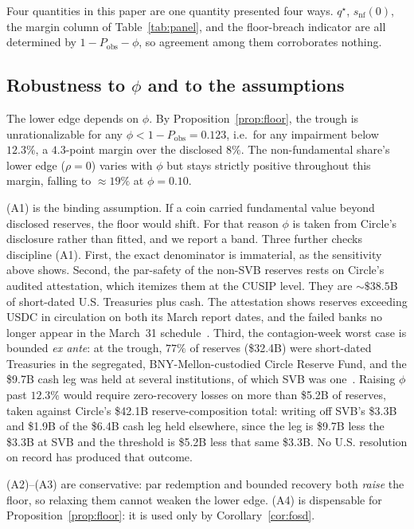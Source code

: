 Four quantities in this paper are one quantity presented four ways. $q^{\star}$,
$s_{\mathrm{nf}}(0)$, the margin column of Table~\ref{tab:panel}, and the floor-breach
indicator are all determined by $1-P_{\mathrm{obs}}-\phi$, so agreement among them
corroborates nothing.

\subsection{Robustness to $\phi$ and to the assumptions}
The lower edge depends on $\phi$.
By Proposition~\ref{prop:floor}, the trough is unrationalizable for any
$\phi<1-P_{\mathrm{obs}}=0.123$, i.e.\ for any impairment below $12.3\%$, a $4.3$-point
margin over the disclosed $8\%$. The non-fundamental share's lower edge ($\rho=0$) varies
with $\phi$ but stays strictly positive throughout this margin, falling to
$\approx 19\%$ at $\phi=0.10$.

(A1) is the binding assumption. If a coin carried fundamental value beyond disclosed
reserves, the floor would shift. For that reason $\phi$ is taken from Circle's disclosure
rather than fitted, and we report a band. Three further checks discipline
(A1). First, the exact denominator is immaterial, as the sensitivity above shows. Second, the par-safety of
the non-SVB reserves rests on Circle's audited attestation, which itemizes them at the CUSIP
level. They are ${\sim}\$38.5$B of short-dated U.S. Treasuries plus cash.
The attestation shows reserves exceeding USDC in circulation on both its March report dates,
and the failed banks no longer appear in the March~31
schedule~\cite{circle2023attestation}.
Third, the contagion-week worst case is bounded \emph{ex ante}: at the trough, $77\%$ of
reserves (\$32.4B) were short-dated Treasuries in the segregated, BNY-Mellon-custodied Circle
Reserve Fund, and the \$9.7B cash leg was held at several
institutions, of which SVB was one~\cite{circle2023update}. Raising $\phi$ past $12.3\%$ would require zero-recovery
losses on more than \$5.2B of reserves, taken against Circle's \$42.1B reserve-composition
total: writing off SVB's \$3.3B and \$1.9B of the \$6.4B cash leg held elsewhere, since
the leg is \$9.7B less the \$3.3B at SVB and the threshold is \$5.2B less that same
\$3.3B. No U.S. resolution on record has produced that outcome.

(A2)--(A3) are conservative: par redemption and bounded recovery both \emph{raise} the
floor, so relaxing them cannot weaken the lower edge. (A4) is dispensable for
Proposition~\ref{prop:floor}: it is used only by Corollary~\ref{cor:fosd}.

